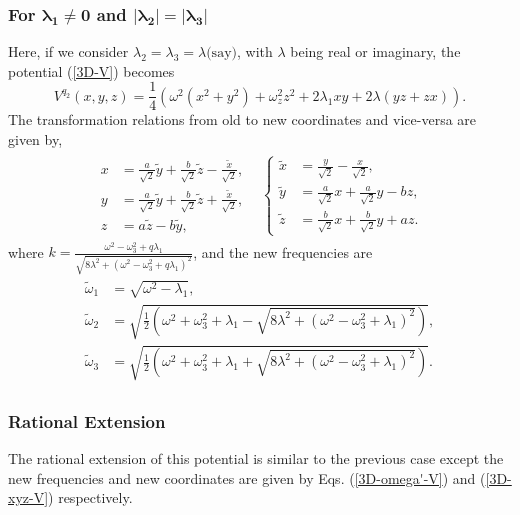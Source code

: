 \documentclass[a4paper, 12pt]{article}
\newcommand{\td}[1]{\tilde{#1}}
\begin{document}
\subsubsection{For $\mathbf{\lambda_1\ne0}$ and $\mathbf{|\lambda_2|=|\lambda_3|}$}
Here, if we consider  $\lambda_2=\lambda_3=\lambda\text{(say)}$, with $\lambda$ being real or imaginary, the potential (\ref{3D-V}) becomes
\begin{equation}
  V^{q_2}(x,y,z)=\frac{1}{4}\left(\omega^2(x^2+y^2)+\omega_z^2z^2+2\lambda_1xy+2\lambda(yz+ zx)\right).
\end{equation}
The transformation relations from old to new coordinates and vice-versa are given by,
\begin{align}\label{3D-xyz-V}
  \begin{split}
  \begin{aligned}
      x &= \frac{a}{\sqrt2}\td{y}+\frac{b}{\sqrt2} \td{z}-\frac{\td{x}}{\sqrt{2}}, \\
      y &= \frac{a}{\sqrt2} \td{y}+\frac{b}{\sqrt2}\td{z}+\frac{\td{x}}{\sqrt{2}},\\
      z &=a\td{z}-b\td{y}, 
  \end{aligned}
  & 
  \left\{
  \begin{aligned}
      \td{x} &= \frac{y}{\sqrt{2}}-\frac{x}{\sqrt{2}} , \\
      \td{y} &=\frac{a}{\sqrt2} x+\frac{a}{\sqrt2}y-bz , \\
      \td{z} &= \frac{b}{\sqrt2} x+\frac{b}{\sqrt2}y+az.
  \end{aligned}
  \right.
  \end{split}
\end{align}
where \(k = \frac{ \omega^2 - \omega_3^2+q\lambda_1}{\sqrt{8 \lambda^2 + \left(\omega^2 - \omega_3^2+q\lambda_1\right)^2}}\), and the new frequencies are 
\begin{align}
  \label{3D-omega'-V}
  \begin{split}
    \td{\omega}_1 &= \sqrt{\omega^2 -  \lambda_1}, \\
    \td{\omega}_2 &= \sqrt{\frac{1}{2}\left(\omega^2+\omega_3^2 +  \lambda_1 - \sqrt{8\lambda^2 + (\omega^2-\omega_3^2 +  \lambda_1)^2}\right)}, \\
    \td{\omega}_3 &= \sqrt{\frac{1}{2}\left(\omega^2+\omega_3^2 +  \lambda_1 + \sqrt{8\lambda^2 + (\omega^2-\omega_3^2 +  \lambda_1)^2}\right)}.
  \end{split}
\end{align}

\subsubsection*{Rational Extension}
The rational extension of this potential is similar to the previous case except the new frequencies and new coordinates are given by Eqs. (\ref{3D-omega'-V}) and  (\ref{3D-xyz-V}) respectively. 
\end{document}
